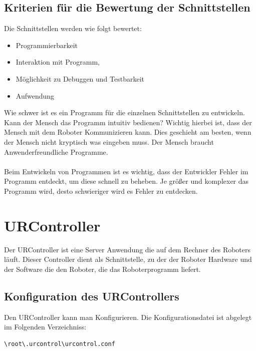 \subsection{Kriterien für die Bewertung der Schnittstellen}
\label{sub:criterias_of_solutions_kon}

Die Schnittstellen werden wie folgt bewertet:

\begin{itemize}
\item Programmierbarkeit
\item Interaktion mit Programm,
\item Möglichkeit zu Debuggen und Testbarkeit
\item Aufwendung
\end{itemize}

Wie schwer ist es ein Programm für die einzelnen Schnittstellen zu entwickeln.
Kann der Mensch das Programm intuitiv bedienen? Wichtig hierbei ist, dass der Mensch mit dem Roboter Kommunizieren kann. Dies geschieht am besten, wenn der Mensch nicht kryptisch was eingeben muss. Der Mensch braucht Anwenderfreundliche Programme.
\\\\
Beim Entwickeln von Programmen ist es wichtig, dass der Entwickler Fehler im Programm entdeckt, um diese schnell zu beheben.
Je größer und komplexer das Programm wird, desto schwieriger wird es Fehler zu entdecken. 

\section{URController}
\label{sec:ur_control_gru}

Der URController ist eine Server Anwendung die auf dem Rechner des Roboters läuft. 
Dieser Controller dient als Schnittstelle, zu der der Roboter Hardware und der Software die den Roboter, die das Roboterprogramm liefert. 

\subsection{Konfiguration des URControllers}
\label{urcontrol_rci_gru}

Den URController kann man Konfigurieren. Die Konfigurationsdatei ist abgelegt im Folgenden Verzeichniss:
\begin{lstlisting}
\root\.urcontrol\urcontrol.conf
\end{lstlisting}

